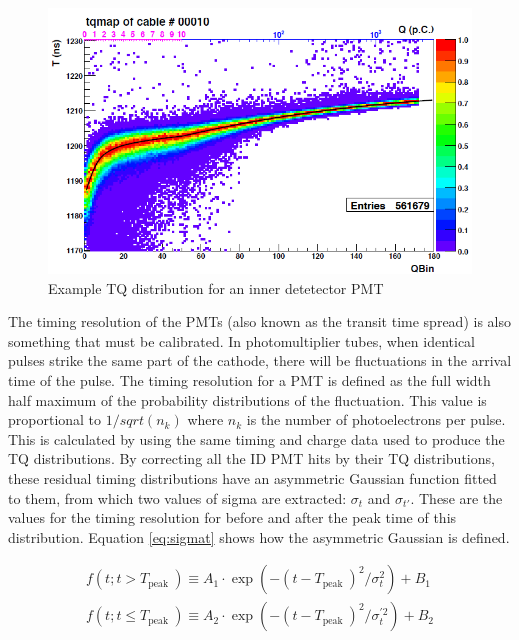 \begin{figure}
    \includegraphics[width=\textwidth]{Figures/TQdist.png}
\caption{Example TQ distribution for an inner detetector PMT}
    \label{fig:TQdist}
\end{figure}


The timing resolution of the PMTs (also known as the transit time spread) is also something that must be calibrated. In photomultiplier tubes, when identical pulses strike the same part of the cathode, there will be fluctuations in the arrival time of the pulse. The timing resolution for a PMT is defined as the full width half maximum of the probability distributions of the fluctuation. This value is proportional to $1/sqrt(n_{k})$ where $n_{k}$ is the number of photoelectrons per pulse. This is calculated by using the same timing and charge data used to produce the TQ distributions. By correcting all the ID PMT hits by their TQ distributions, these residual timing distributions have an asymmetric Gaussian function fitted to them, from which two values of sigma are extracted: $\sigma_{t}$ and $\sigma_{t'}$. These are the values for the timing resolution for before and after the peak time of this distribution. Equation \ref{eq:sigmat} shows how the asymmetric Gaussian is defined. 


\begin{align}
    f\left(t ; t>T_{\text {peak }}\right) \equiv A_{1} \cdot \exp \left(-\left(t-T_{\text {peak }}\right)^{2} / \sigma_{t}^{2}\right)+B_{1}\\
    f\left(t ; t \leq T_{\text {peak }}\right) \equiv A_{2} \cdot \exp \left(-\left(t-T_{\text {peak }}\right)^{2} / \sigma_{t}^{\prime 2}\right)+B_{2}
\label{eq:sigmat}
\end{align}

